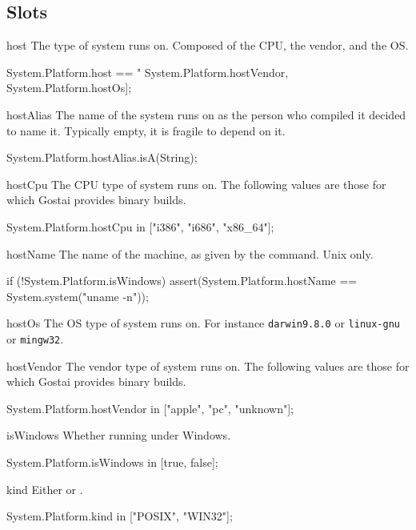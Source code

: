\subsection{Slots}
\begin{urbiscriptapi}
\item[host] The type of system \usdk runs on.  Composed of the CPU, the
  vendor, and the OS.
\begin{urbiassert}
System.Platform.host ==
  "%
                System.Platform.hostVendor,
                System.Platform.hostOs];
\end{urbiassert}


\item[hostAlias] The name of the system \usdk runs on as the person who
  compiled it decided to name it.  Typically empty, it is fragile to depend
  on it.
\begin{urbiassert}
System.Platform.hostAlias.isA(String);
\end{urbiassert}


\item[hostCpu] The CPU type of system \usdk runs on.  The following values
  are those for which Gostai provides binary builds.
\begin{urbiassert}
System.Platform.hostCpu in ["i386", "i686", "x86_64"];
\end{urbiassert}


\item[hostName]%
  The name of the machine, as given by the  command. Unix
  only.
\begin{urbiunchecked}
if (!System.Platform.isWindows)
  assert(System.Platform.hostName == System.system("uname -n"));
\end{urbiunchecked}


\item[hostOs] The OS type of system \usdk runs on.  For instance
  \lstinline|darwin9.8.0| or \lstinline|linux-gnu| or \lstinline|mingw32|.


\item[hostVendor] The vendor type of system \usdk runs on.  The following
  values are those for which Gostai provides binary builds.
\begin{urbiassert}
System.Platform.hostVendor in ["apple", "pc", "unknown"];
\end{urbiassert}


\item[isWindows] Whether running under Windows.
\begin{urbiassert}
System.Platform.isWindows in [true, false];
\end{urbiassert}


\item[kind] Either  or .
\begin{urbiassert}
System.Platform.kind in ["POSIX", "WIN32"];
\end{urbiassert}
\end{urbiscriptapi}

